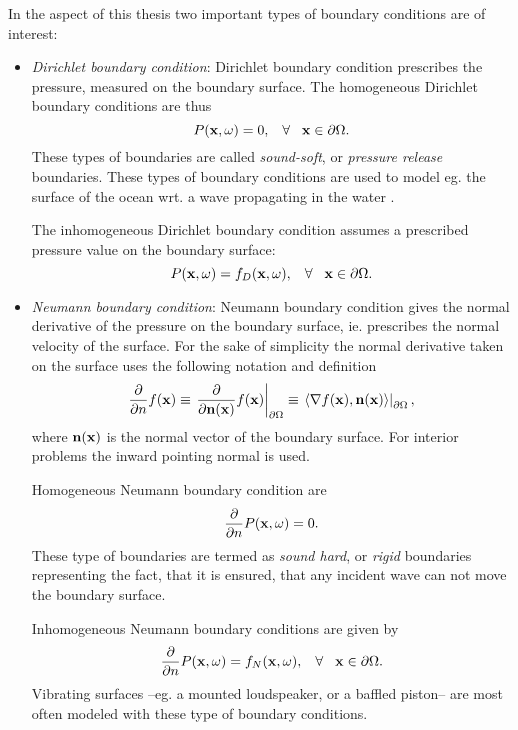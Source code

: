 In the aspect of this thesis two important types of boundary conditions are of interest:
\begin{itemize}
\item \emph{Dirichlet boundary condition}:
Dirichlet boundary condition prescribes the pressure, measured on the boundary surface. The homogeneous Dirichlet boundary conditions are thus
\begin{equation}
P(\mathbf{x},\omega) = 0, \hspace{3mm} \forall \hspace{3mm} \mathbf{x} \in \partial \Omega.
\end{equation}
These types of boundaries are called \emph{sound-soft}, or \emph{pressure release} boundaries. These types of boundary conditions are used to model eg. the surface of the ocean wrt. a wave propagating in the water \cite{Blackstock2000, Ziomek1995}.

The inhomogeneous Dirichlet boundary condition assumes a prescribed pressure value on the boundary surface:
\begin{equation}
P(\mathbf{x},\omega) = f_D(\mathbf{x},\omega), \hspace{3mm} \forall \hspace{3mm} \mathbf{x} \in \partial \Omega.
\end{equation}

\item \emph{Neumann boundary condition}:
Neumann boundary condition gives the normal derivative of the pressure on the boundary surface, ie. prescribes the normal velocity of the surface. For the sake of simplicity the normal derivative taken on the surface uses the following notation and definition
\begin{equation}
\frac{\partial}{\partial n} f(\mathbf{x})\equiv \left. \frac{\partial}{\partial \mathbf{n}(\mathbf{x})} f(\mathbf{x}) \right|_{\partial \Omega} \equiv \left. \langle \nabla f(\mathbf{x}), \mathbf{n}(\mathbf{x}) \rangle \right|_{\partial \Omega},
\end{equation}
where $ \mathbf{n}(\mathbf{x}) $ is the normal vector of the boundary surface. For interior problems the inward pointing normal is used.

Homogeneous Neumann boundary condition are
\begin{equation}
\frac{\partial}{\partial  n }P(\mathbf{x},\omega)= 0.
\end{equation}
These type of boundaries are termed as \emph{sound hard}, or \emph{rigid} boundaries representing the fact, that it is ensured, that any incident wave can not move the boundary surface.

Inhomogeneous Neumann boundary conditions are given by
\begin{equation}
\frac{\partial}{\partial n }P(\mathbf{x},\omega) = f_N(\mathbf{x},\omega), \hspace{3mm} \forall \hspace{3mm} \mathbf{x} \in \partial \Omega.
\end{equation}
Vibrating surfaces --eg. a mounted loudspeaker, or a baffled piston-- are most often modeled with these type of boundary conditions.

\end{itemize}

